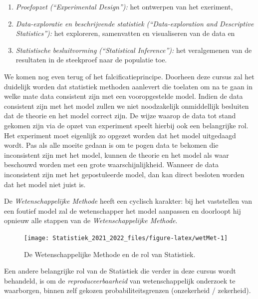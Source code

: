 \documentclass[
  12pt,dutch,coursenotes]{book}
\providecommand{\tightlist}{%
  \setlength{\itemsep}{0pt}\setlength{\parskip}{0pt}}
\theoremstyle{definition}
\theoremstyle{definition}
\theoremstyle{definition}
\theoremstyle{definition}
\theoremstyle{remark}
\begin{document}
\begin{itemize}
  \begin{enumerate}
  \def\labelenumi{\arabic{enumi}.}
  \tightlist
  \item
    \emph{Proefopzet (``Experimental Design''):} het ontwerpen van het exeriment,
  \item
    \emph{Data-exploratie en beschrijvende statistiek (``Data-exploration and Descriptive Statistics''):} het exploreren, samenvatten en visualiseren van de data en
  \item
    \emph{Statistische besluitvorming (``Statistical Inference''):} het veralgemenen van de resultaten in de steekproef naar de populatie toe.
  \end{enumerate}
\end{itemize}

We komen nog even terug of het falcificatieprincipe. Doorheen deze cursus zal het duidelijk worden dat statistiek methoden aanlevert die toelaten om na te gaan in welke mate data consistent zijn met een vooropgestelde model. Indien de data consistent zijn met het model zullen we niet noodzakelijk onmiddellijk besluiten dat de theorie en het model correct zijn. De wijze waarop de data tot stand gekomen zijn via de opzet van experiment speelt hierbij ook een belangrijke rol. Het experiment moet eigenlijk zo opgezet worden dat het model uitgedaagd wordt. Pas als alle moeite gedaan is om te pogen data te bekomen die inconsistent zijn met het model, kunnen de theorie en het model als waar beschouwd worden met een grote waarschijnlijkheid. Wanneer de data inconsistent zijn met het gepostuleerde model, dan kan direct besloten worden dat het model niet juist is.

De \emph{Wetenschappelijke Methode} heeft een cyclisch karakter: bij het vaststellen van een foutief model zal de wetenschapper het model aanpassen en doorloopt hij opnieuw alle stappen van de \emph{Wetenschappelijke Methode}.

\begin{figure}

{\centering \texttt{[image: Statistiek\_2021\_2022\_files/figure-latex/wetMet-1]} 

}

\caption{De Wetenschappelijke Methode en de rol van Statistiek.}\label{fig:wetMet}
\end{figure}

Een andere belangrijke rol van de Statistiek die verder in deze cursus wordt behandeld, is om de \emph{reproduceerbaarheid} van wetenschappelijk onderzoek te waarborgen, binnen zelf gekozen probabiliteitsgrenzen (onzekerheid / zekerheid).
\end{document}
